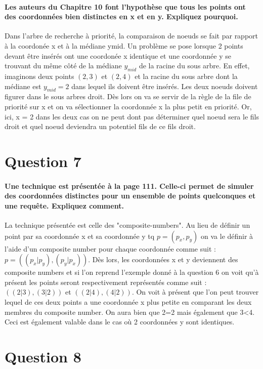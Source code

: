 \documentclass{article}
\begin{document}
    \paragraph{Les auteurs du Chapitre 10 font l’hypothèse que tous les points ont des coordonnées bien
distinctes en x et en y. Expliquez pourquoi.}
Dans l'arbre de recherche à priorité, la comparaison de noeuds se fait par rapport à la coordonée x et à la médiane ymid. Un problème se pose lorsque 2 points devant être insérés ont une coordonée x identique et une coordonnée y se trouvant du 
même côté de la médiane $y_{mid}$ de la racine du sous arbre. En effet, imaginons deux points $(2,3)$ et $(2,4)$ et la racine du sous arbre dont la médiane est $y_{mid} = 2$ dans lequel ils doivent être insérés. Les deux noeuds doivent figurer dans
le sous arbres droit. Dès lors on va se servir de la règle de la file de priorité sur x et on va sélectionner la coordonnée x la plus petit en priorité. Or, ici, x = 2 dans les deux cas on ne peut dont pas déterminer quel noeud sera le fils droit 
et quel noeud deviendra un potentiel fils de ce fils droit.

\section{Question 7}
    \paragraph{Une technique est présentée à la page 111. Celle-ci permet de simuler des coordonnées
distinctes pour un ensemble de points quelconques et une requête. Expliquez comment.}
La technique présentée est celle des "composite-numbers". Au lieu de définir un point par sa coordonnée x et sa coordonnée y tq $p = (p_x , p_y)$ on va le définir à l'aide
d'un composite number pour chaque coordonnée comme suit : $p = ((p_x|p_y),(p_y|p_x))$.
Dès lors, les coordonnées x et y deviennent des composite numbers et si l'on reprend l'exemple donné à la question 6 on voit qu'à présent les points seront respectivement
représentés comme suit : $((2|3), (3|2))$ et $((2|4),(4|2))$. On voit à présent que l'on peut trouver lequel de ces deux points a une coordonnée x plus petite en comparant
les deux membres du composite number. On aura bien que 2=2 mais également que 3<4. Ceci est également valable dans le cas où 2 coordonnées y sont identiques.

\section{Question 8}
\end{document}
